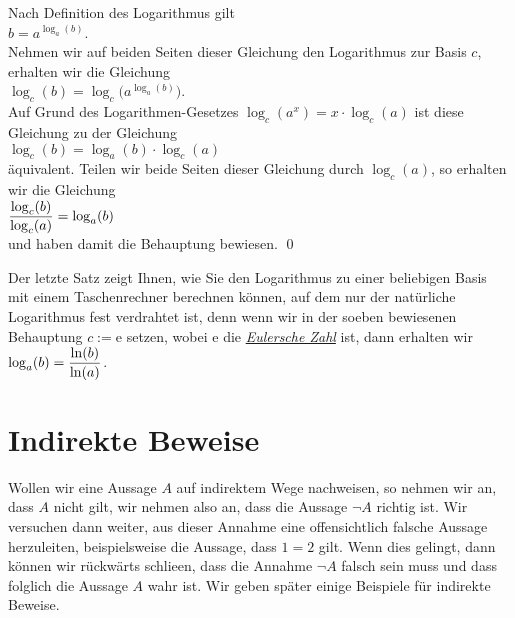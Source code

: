 \proof
Nach Definition des Logarithmus gilt
\\[0.2cm]
\hspace*{1.3cm}
$b = a^{\log_a(b)}$.
\\[0.2cm]
Nehmen  wir auf beiden Seiten dieser Gleichung den Logarithmus zur Basis $c$, erhalten wir die Gleichung
\\[0.2cm]
\hspace*{1.3cm}
$\log_c(b) = \log_c\bigl(a^{\log_a(b)}\bigr)$.
\\[0.2cm]
Auf Grund des Logarithmen-Gesetzes $\log_c(a^x) = x \cdot \log_c(a)$ ist diese Gleichung zu
der  Gleichung
\\[0.2cm]
\hspace*{1.3cm}
$\log_c(b) = \log_a(b) \cdot \log_c(a)$
\\[0.2cm]
\"{a}quivalent.  Teilen wir beide Seiten dieser Gleichung durch $\log_c(a)$, so erhalten wir die Gleichung
\\[0.2cm]
\hspace*{1.3cm}
$\displaystyle\frac{\log_c(b)}{\log_c(a)} = \log_a(b)$
\\[0.2cm]
und haben damit die Behauptung bewiesen.
\qed

\remark
Der letzte Satz zeigt Ihnen, wie Sie den Logarithmus zu einer beliebigen Basis mit einem
Taschenrechner berechnen k\"{o}nnen, auf dem nur der nat\"{u}rliche Logarithmus fest verdrahtet ist,
denn wenn wir in der soeben bewiesenen Behauptung $c := \mathrm{e}$ setzen, wobei $\mathrm{e}$ die 
\href{https://de.wikipedia.org/wiki/Eulersche_Zahl}{\emph{Eulersche Zahl}} ist, dann erhalten wir
\\[0.2cm]
\hspace*{1.3cm}
$\displaystyle\log_a(b) = \frac{\ln(b)}{\ln(a)}$.
\eox


\section{Indirekte Beweise}
Wollen wir eine Aussage $A$ auf indirektem Wege nachweisen, so nehmen wir an, dass $A$
nicht gilt, wir nehmen also an, dass die Aussage $\neg A$ richtig ist.  Wir versuchen dann
weiter, aus dieser Annahme eine offensichtlich falsche Aussage herzuleiten, beispielsweise
die Aussage, dass $1 = 2$ gilt.  Wenn dies gelingt, dann k\"{o}nnen wir r\"{u}ckw\"{a}rts schlie\3en,
dass die Annahme $\neg A$ falsch sein muss und dass folglich die Aussage $A$ wahr ist.
Wir geben sp\"{a}ter einige Beispiele f\"{u}r indirekte Beweise.
\vspace*{0.2cm}

